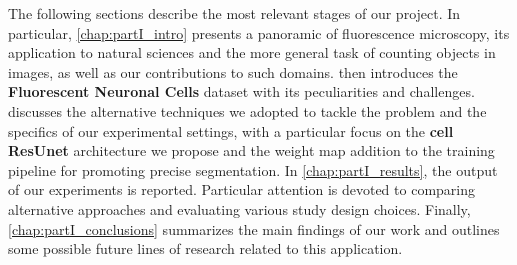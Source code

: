 The following sections describe the most relevant stages of our project.
In particular, \cref{chap:partI_intro} presents a panoramic of fluorescence microscopy, its application to natural sciences and the more general task of counting objects in images, as well as our contributions to such domains.
 then introduces the \textbf{Fluorescent Neuronal Cells} dataset with its peculiarities and challenges.
 discusses the alternative techniques we adopted to tackle the problem and the specifics of our experimental settings, with a particular focus on the \textbf{cell ResUnet} architecture we propose and the weight map addition to the training pipeline for promoting precise segmentation.
In \cref{chap:partI_results}, the output of our experiments is reported. Particular attention is devoted to comparing alternative approaches and evaluating various study design choices.
Finally, \cref{chap:partI_conclusions} summarizes the main findings of our work and outlines some possible future lines of research related to this application.